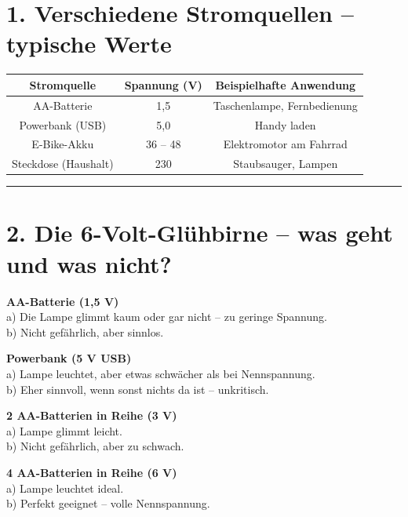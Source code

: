 \documentclass[a4paper,12pt]{article}
\begin{document}
	
	\section*{1. Verschiedene Stromquellen – typische Werte}
	
	\begin{center}
		\begin{tabular}{ccc}
			\toprule
			\textbf{Stromquelle} & \textbf{Spannung (V)} & \textbf{Beispielhafte Anwendung} \\
			\midrule
			AA-Batterie & 1{,}5 & Taschenlampe, Fernbedienung \\
			Powerbank (USB) & 5{,}0  & Handy laden \\
			E-Bike-Akku & 36 – 48 & Elektromotor am Fahrrad \\
			Steckdose (Haushalt) & 230 & Staubsauger, Lampen \\
			\bottomrule
		\end{tabular}
	\end{center}
	
	\hrule
	
	\section*{2. Die 6-Volt-Glühbirne – was geht und was nicht?}
	
	\textbf{AA-Batterie (1{,}5 V)}   \\
	a) Die Lampe glimmt kaum oder gar nicht – zu geringe Spannung.   \\
	b) Nicht gefährlich, aber sinnlos.
	
	\textbf{Powerbank (5 V USB)}   \\
	a) Lampe leuchtet, aber etwas schwächer als bei Nennspannung.   \\
	b) Eher sinnvoll, wenn sonst nichts da ist – unkritisch.
	
	\textbf{2 AA-Batterien in Reihe (3 V)}   \\
	a) Lampe glimmt leicht.   \\
	b) Nicht gefährlich, aber zu schwach.
	
	\textbf{4 AA-Batterien in Reihe (6 V)}   \\
	a) Lampe leuchtet ideal.   \\
	b) Perfekt geeignet – volle Nennspannung.
	
\end{document}
